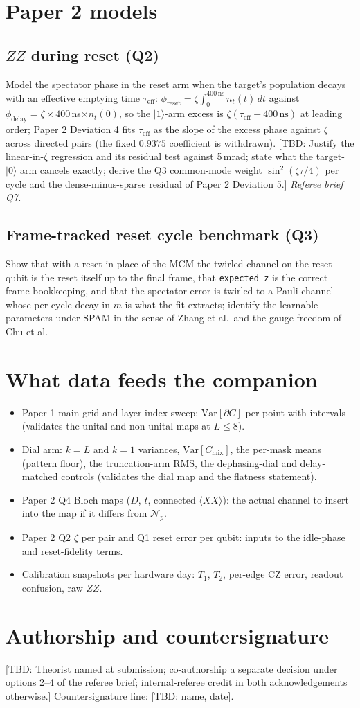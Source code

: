 \documentclass[11pt,a4paper]{article}
\newcommand{\tbd}[1]{\textcolor{orange!80!black}{[TBD: #1]}}
\newcommand{\Var}{\mathrm{Var}}
\newcommand{\Np}{\mathcal{N}_p}
\begin{document}
\section{Paper 2 models}
\subsection{$ZZ$ during reset (Q2)}
Model the spectator phase in the reset arm when the target's population decays with an effective emptying time $\tau_{\mathrm{eff}}$: $\phi_{\mathrm{reset}} = \zeta\int_0^{400\,\mathrm{ns}} n_t(t)\,dt$ against $\phi_{\mathrm{delay}} = \zeta\times400$\,ns$\times n_t(0)$, so the $|1\rangle$-arm excess is $\zeta(\tau_{\mathrm{eff}} - 400\,\mathrm{ns})$ at leading order; Paper 2 Deviation 4 fits $\tau_{\mathrm{eff}}$ as the slope of the excess phase against $\zeta$ across directed pairs (the fixed $0.9375$ coefficient is withdrawn). \tbd{Justify the linear-in-$\zeta$ regression and its residual test against 5\,mrad; state what the target-$|0\rangle$ arm cancels exactly; derive the Q3 common-mode weight $\sin^2(\zeta\tau/4)$ per cycle and the dense-minus-sparse residual of Paper 2 Deviation 5.} \emph{Referee brief Q7.}
\subsection{Frame-tracked reset cycle benchmark (Q3)}
Show that with a reset in place of the MCM the twirled channel on the reset qubit is the reset itself up to the final frame, that \texttt{expected\_z} is the correct frame bookkeeping, and that the spectator error is twirled to a Pauli channel whose per-cycle decay in $m$ is what the fit extracts; identify the learnable parameters under SPAM in the sense of Zhang et al.\ and the gauge freedom of Chu et al.

\section{What data feeds the companion}
\begin{itemize}
\item Paper 1 main grid and layer-index sweep: $\Var[\partial C]$ per point with intervals (validates the unital and non-unital maps at $L \leq 8$).
\item Dial arm: $k = L$ and $k = 1$ variances, $\Var[C_{\mathrm{mix}}]$, the per-mask means (pattern floor), the truncation-arm RMS, the dephasing-dial and delay-matched controls (validates the dial map and the flatness statement).
\item Paper 2 Q4 Bloch maps ($D$, $t$, connected $\langle XX\rangle$): the actual channel to insert into the map if it differs from $\Np$.
\item Paper 2 Q2 $\zeta$ per pair and Q1 reset error per qubit: inputs to the idle-phase and reset-fidelity terms.
\item Calibration snapshots per hardware day: $T_1$, $T_2$, per-edge CZ error, readout confusion, raw $ZZ$.
\end{itemize}

\section{Authorship and countersignature}
\tbd{Theorist named at submission; co-authorship a separate decision under options 2--4 of the referee brief; internal-referee credit in both acknowledgements otherwise.} Countersignature line: \tbd{name, date}.
\end{document}
